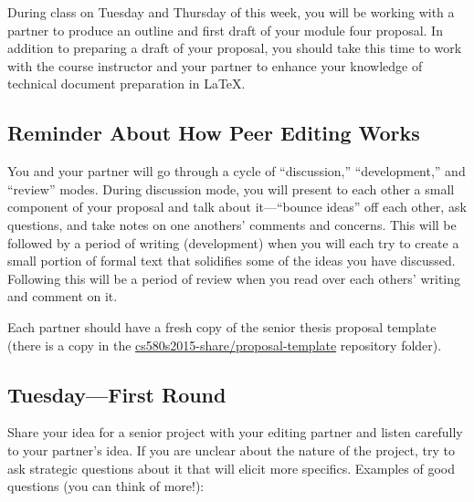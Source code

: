 

\usepackage[compact]{titlesec}




During class on Tuesday and Thursday of this week, you will be working with a partner to produce an outline and first
draft of your module four proposal. In addition to preparing a draft of your proposal, you should take this time to
work with the course instructor and your partner to enhance your knowledge of technical document preparation in \LaTeX.

\subsection*{Reminder About How Peer Editing Works}

You and your partner will go through a cycle of ``discussion,'' ``development,'' and ``review''  modes.  During
discussion mode, you will present to each other a small component of your proposal and talk about it---``bounce ideas''
off each other, ask questions, and take notes on one anothers' comments and concerns.  This will be followed by a period
of writing (development) when you will each try to create a small portion of formal text that solidifies some of the
ideas you have discussed.  Following this will be a period of review when you read over each others' writing and comment
on it.

Each partner should have a fresh copy of the senior thesis proposal template
(there is a copy in the \url{cs580s2015-share/proposal-template} repository
folder).

\subsection*{Tuesday---First Round}

 Share your idea for a senior project with your editing
partner and listen carefully to your partner's idea. If you are unclear about
the nature of the project, try to ask strategic questions about it that will
elicit more specifics. Examples of good questions (you can think of more!):

